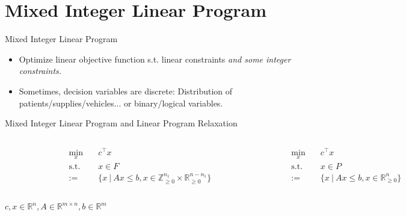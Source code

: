 \section{Mixed Integer Linear Program}

\begin{frame}{Mixed Integer Linear Program}
\begin{itemize}
\item Optimize linear objective function s.t. linear constraints \emph{and some integer constraints.}
\item Sometimes, decision variables are discrete: Distribution of patients/supplies/vehicles... or binary/logical variables.
\end{itemize}
\end{frame}

\begin{frame}{Mixed Integer Linear Program and Linear Program Relaxation}
\small
\begin{columns}

	\begin{figure}
	\centering
	
	\end{figure}
	
	\begin{tcolorbox}[colback=white, title={MILP (standard form)}]
    \begin{align*}
    	\min_{x}\quad &c^\top x \\
    	\text{s.t.}\quad & x\in F \\
    	:= &\{x \:\vert\: Ax \leq b, x \in \mathbb{Z}_{\geq 0}^{n_1} \times \mathbb{R}_{\geq 0}^{n-n_1} \}
    \end{align*}
    \end{tcolorbox}

	\begin{figure}
	\centering
	
	\end{figure}
	
	\begin{tcolorbox}[colback=white, title={LP Relaxation}]
    \begin{align*}
    	\min_{x}\quad &c^\top x \\
    	\text{s.t.}\quad &x \in P\\
    	:= &\{x \:\vert\: Ax \leq b, x \in \mathbb{R}_{\geq 0}^{n}\}
    \end{align*}
    \end{tcolorbox}
\end{columns}
$c,x \in \mathbb{R}^n, A \in \mathbb{R}^{m \times n}, b \in \mathbb{R}^m$
\end{frame}



